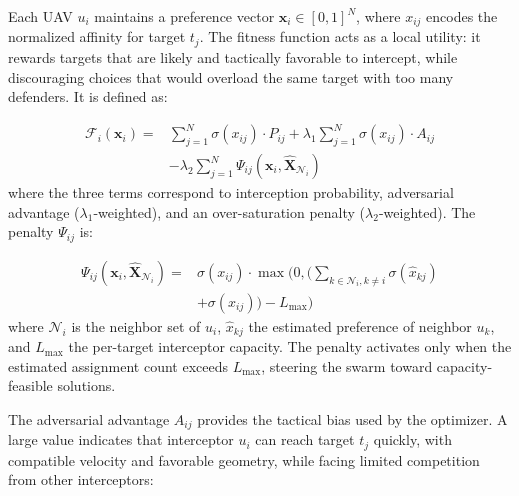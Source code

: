\documentclass[lettersize,journal]{IEEEtran}
\begin{document}
Each UAV $u_i$ maintains a preference vector $\mathbf{x}_i \in [0,1]^{N}$, where $x_{ij}$ encodes the normalized affinity for target $t_j$. The fitness function acts as a local utility: it rewards targets that are likely and tactically favorable to intercept, while discouraging choices that would overload the same target with too many defenders. It is defined as:

\begin{equation}
\label{eq:idbo_fitness}
\begin{split}
\mathcal{F}_i(\mathbf{x}_i) =& \sum_{j=1}^{N} \sigma(x_{ij}) \cdot P_{ij} + \lambda_1 \sum_{j=1}^{N} \sigma(x_{ij}) \cdot A_{ij} \\
&- \lambda_2 \sum_{j=1}^{N} \Psi_{ij}(\mathbf{x}_i, \hat{\mathbf{X}}_{\mathcal{N}_i})
\end{split}
\end{equation}
where the three terms correspond to interception probability, adversarial advantage ($\lambda_1$-weighted), and an over-saturation penalty ($\lambda_2$-weighted). The penalty $\Psi_{ij}$ is:

\begin{equation}
\label{eq:saturation_penalty}
\begin{split}
\Psi_{ij}(\mathbf{x}_i, \hat{\mathbf{X}}_{\mathcal{N}_i}) =& \sigma(x_{ij}) \cdot \max\Biggl(0, \Biggl(\sum_{k \in \mathcal{N}_i, k \neq i} \sigma(\hat{x}_{kj}) \\
&+ \sigma(x_{ij})\Biggr) - L_{\max}\Biggr)
\end{split}
\end{equation}
where $\mathcal{N}_i$ is the neighbor set of $u_i$, $\hat{x}_{kj}$ the estimated preference of neighbor $u_k$, and $L_{\max}$ the per-target interceptor capacity. The penalty activates only when the estimated assignment count exceeds $L_{\max}$, steering the swarm toward capacity-feasible solutions.

The adversarial advantage $A_{ij}$ provides the tactical bias used by the optimizer. A large value indicates that interceptor $u_i$ can reach target $t_j$ quickly, with compatible velocity and favorable geometry, while facing limited competition from other interceptors:
\end{document}

